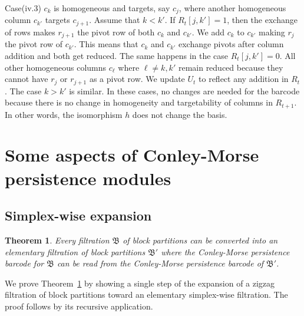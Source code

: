 \documentclass[letterpaper,11pt]{article}
\theoremstyle{plain}
\newtheorem{theorem}{Theorem}[section]
\theoremstyle{definition}
\newcounter{li}
\newcommand{\zzBD}{\mathfrak{B}}
\begin{document}
Case(iv.3) $c_k$ is homogeneous and targets, say $c_j$, where another homogeneous column $c_{k'}$ targets $c_{j+1}$. Assume that $k<k'$. If $R_t[j,k']=1$,
then the exchange of rows makes 
$r_{j+1}$ the pivot row of both $c_k$ and $c_{k'}$. We add
$c_k$ to $c_{k'}$ making $r_j$ the pivot row of $c_{k'}$. This means that 
$c_k$ and $c_{k'}$ exchange pivots after column addition and both get reduced. The same happens in the case $R_t[j,k']= 0$. All other homogeneous
columns $c_\ell$ where $\ell\neq k,k'$ remain reduced because they cannot have
$r_j$ or $r_{j+1}$ as a pivot row. We update $U_t$ to reflect any addition
in $R_t$. The case $k>k'$ is similar. In these cases, no changes are needed for the
barcode because there is no change in homogeneity and targetability of columns in $R_{t+1}$.
In other words, the isomorphism $h$ does not change the basis.

\section{Some aspects of Conley-Morse persistence modules}
\subsection{Simplex-wise expansion}
\label{sec:elementary-expansion}
\begin{theorem}\label{thm:elementary-expansion}
        Every filtration $\zzBD$ of block partitions can be converted into an elementary filtration of block partitions $\zzBD'$ where the
        Conley-Morse persistence barcode for $\zzBD$ can be read from the Conley-Morse 
        persistence barcode of $\zzBD'$.
\end{theorem}
We prove Theorem~\ref{thm:elementary-expansion} by showing a single step of the expansion of a zigzag filtration of block partitions toward an elementary simplex-wise filtration.
The proof follows by its recursive application.
\end{document}
